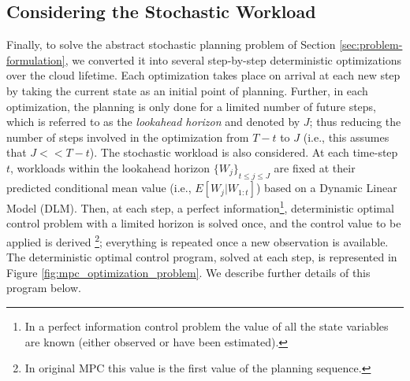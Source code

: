 \subsection{Considering the Stochastic Workload }  
\label{sec:addressing-stochastic-workload}
 Finally, to solve the abstract stochastic planning problem of Section \ref{sec:problem-formulation}, %
 we converted it into several step-by-step deterministic optimizations over the cloud lifetime. Each optimization takes place on arrival at each new step by taking the current state as an initial point of planning.  
Further, in each optimization, the planning is only done for a limited number of future steps, which is referred to as the  \textit{lookahead horizon} and denoted by $J$; thus reducing the number of steps involved in the optimization from $T-t$ to $J$ (i.e., this assumes that $J << T-t$). 
The stochastic workload is also considered. %
At each time-step $t$, workloads within the lookahead horizon ${\{W_j\}}_{t\leq j \leq J}$ are fixed at their predicted conditional mean value (i.e., $E[W_j|W_{1:t}]$) based on a Dynamic Linear Model (DLM)\cite{zheng-integrated-2011}. 
Then, at each step, a perfect information\footnote{In a perfect information control problem the value of all the state variables are known (either observed or have been estimated).}, deterministic optimal control problem with a limited horizon is solved once, and the control value to be applied is derived \footnote{In original MPC this value is the first value of the planning sequence.}; everything is repeated once a new observation is available. 
The deterministic optimal control program, solved at each step, is represented in Figure \ref{fig:mpc_optimization_problem}. We describe further details of this program below. 

